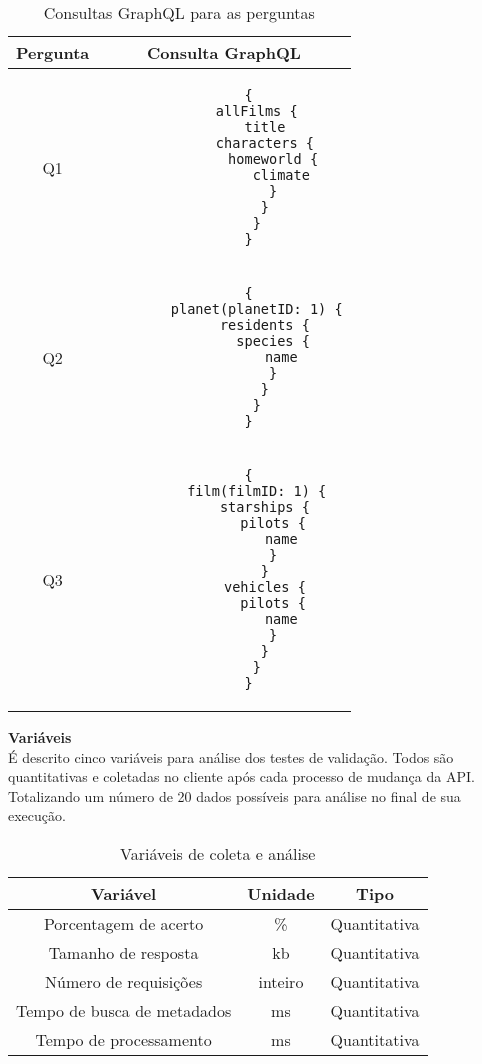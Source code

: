\begin{table}[H]
  \centering
  \begin{tabular}{|c|c|}
    \hline
    Pergunta & Consulta GraphQL \\
    \hline
    Q1 & \begin{minipage}[t]{0.5\textwidth}
      \begin{verbatim}
      {
        allFilms {
          title
          characters {
            homeworld {
              climate
            }
          }
        }
      }
      \end{verbatim}
    \end{minipage} \\
    \hline
    Q2 & \begin{minipage}[t]{0.5\textwidth}
      \begin{verbatim}
      {
        planet(planetID: 1) {
          residents {
            species {
              name
            }
          }
        }
      }
      \end{verbatim}
    \end{minipage} \\
    \hline
    Q3 & \begin{minipage}[t]{0.5\textwidth}
      \begin{verbatim}
      {
        film(filmID: 1) {
          starships {
            pilots {
              name
            }
          }
          vehicles {
            pilots {
              name
            }
          }
        }
      }
      \end{verbatim}
    \end{minipage} \\
    \hline
  \end{tabular}
  \caption{Consultas GraphQL para as perguntas}
\end{table}

\textbf{Variáveis} \\

É descrito cinco variáveis para análise dos testes de validação. Todos são quantitativas e coletadas no cliente após cada processo de mudança da API. Totalizando um número de 20 dados possíveis para análise no final de sua execução.

\begin{table}[H]
  \centering
  \begin{tabular}{|c|c|c|}
    \hline
    Variável & Unidade & Tipo \\
    \hline
    Porcentagem de acerto & \% & Quantitativa \\
    \hline
    Tamanho de resposta & kb & Quantitativa \\
    \hline
    Número de requisições & inteiro & Quantitativa \\
    \hline
    Tempo de busca de metadados & ms & Quantitativa \\
    \hline
    Tempo de processamento & ms & Quantitativa \\
    \hline
  \end{tabular}
  \caption{Variáveis de coleta e análise}
\end{table}

 
 
 
 
 
 

 
